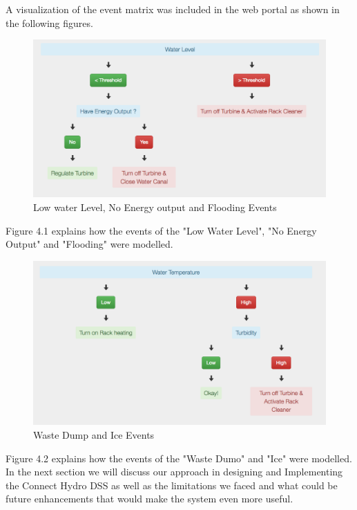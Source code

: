 A visualization of the event matrix was included in the web portal as shown in the following figures.
\begin{figure}[H]
\centering
\includegraphics[scale=0.4]{Images/WaterLevel.png}
\caption[Low water Level, No Energy output and Flooding Events]{Low water Level, No Energy output and Flooding Events}
\end{figure}
Figure 4.1 explains how the events of the "Low Water Level", "No Energy Output" and "Flooding" were modelled.
\begin{figure}[H]
\centering
\includegraphics[scale=0.4]{Images/WaterTemperatureAndTurbidity.png}
\caption[Waste Dump and Ice Events]{Waste Dump and Ice Events}
\end{figure}
Figure 4.2 explains how the events of the "Waste Dumo" and "Ice" were modelled.
In the next section we will discuss our approach in designing and Implementing the Connect Hydro DSS as well as the limitations we faced and what could be future enhancements that would make the system even more useful.
